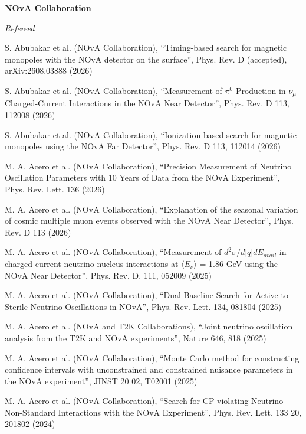 
{\bf NOvA Collaboration}

{\it Refereed}
\begin{list2}
\item S. Abubakar et al. (NOvA Collaboration), ``Timing-based search for magnetic monopoles with the NOvA detector on the surface'', Phys. Rev. D (accepted), arXiv:2608.03888 (2026)
\item S. Abubakar et al. (NOvA Collaboration), ``Measurement of $\pi^0$ Production in $\bar\nu_\mu$ Charged-Current Interactions in the NOvA Near Detector'', Phys. Rev. D 113, 112008 (2026)
\item S. Abubakar et al. (NOvA Collaboration), ``Ionization-based search for magnetic monopoles using the NOvA Far Detector'', Phys. Rev. D 113, 112014 (2026)
\item M. A. Acero et al. (NOvA Collaboration), ``Precision Measurement of Neutrino Oscillation Parameters with 10 Years of Data from the NOvA Experiment'', Phys. Rev. Lett. 136 (2026)
\item M. A. Acero et al. (NOvA Collaboration), ``Explanation of the seasonal variation of cosmic multiple muon events observed with the NOvA Near Detector'', Phys. Rev. D 113 (2026)
\item M. A. Acero et al. (NOvA Collaboration), ``Measurement of $d^2\sigma/d|q|dE_{avail}$ in charged current neutrino-nucleus interactions at $\langle E_\nu\rangle$ = 1.86 GeV using the NOvA Near Detector'', Phys. Rev. D. 111, 052009 (2025)
\item M. A. Acero et al. (NOvA Collaboration), ``Dual-Baseline Search for Active-to-Sterile Neutrino Oscillations in NOvA'', Phys. Rev. Lett. 134, 081804 (2025)
\item M. A. Acero et al. (NOvA and T2K Collaborations), ``Joint neutrino oscillation analysis from the T2K and NOvA experiments'', Nature 646, 818 (2025)
\item M. A. Acero et al. (NOvA Collaboration), ``Monte Carlo method for constructing confidence intervals with unconstrained and constrained nuisance parameters in the NOvA experiment'', JINST 20 02, T02001 (2025)
\item M. A. Acero et al. (NOvA Collaboration), ``Search for CP-violating Neutrino Non-Standard Interactions with the NOvA Experiment'', Phys. Rev. Lett. 133 20, 201802 (2024)

\end{list2}
